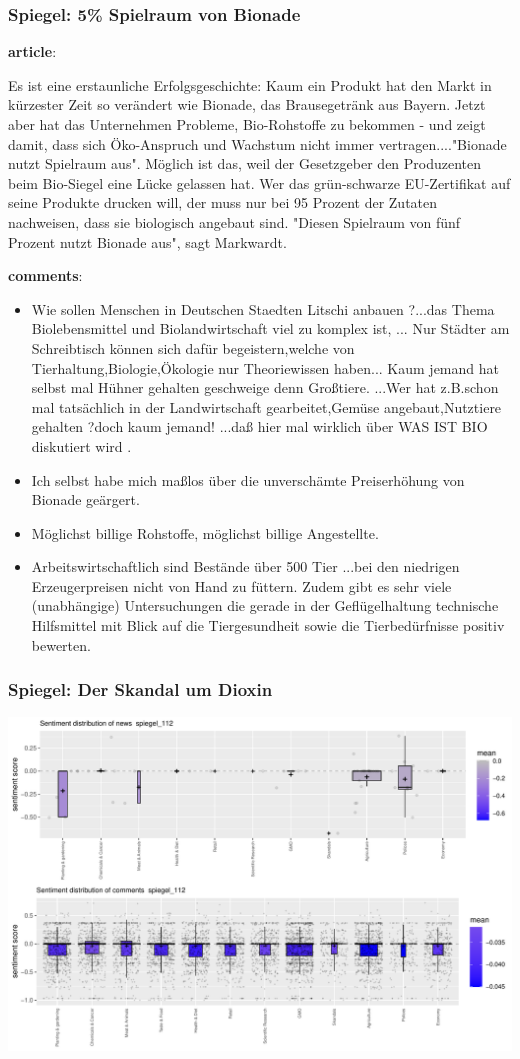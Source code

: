 \documentclass{tum-presentation}
\begin{document}
\begin{frame}
  \frametitle{ Spiegel: 5\% Spielraum von Bionade }
  \begin{description}
    \item \textbf{article}:
    \item Es ist eine erstaunliche Erfolgsgeschichte: Kaum ein Produkt hat den Markt in kürzester Zeit so verändert wie Bionade, das Brausegetränk aus Bayern. Jetzt aber hat das Unternehmen Probleme, Bio-Rohstoffe zu bekommen - und zeigt damit, dass sich Öko-Anspruch und Wachstum nicht immer vertragen...."Bionade nutzt Spielraum aus". Möglich ist das, weil der Gesetzgeber den Produzenten beim Bio-Siegel eine Lücke gelassen hat. Wer das grün-schwarze EU-Zertifikat auf seine Produkte drucken will, der muss nur bei 95 Prozent der Zutaten nachweisen, dass sie biologisch angebaut sind. "Diesen Spielraum von fünf Prozent nutzt Bionade aus", sagt Markwardt.
    \item \textbf{comments}:
    \item  \begin{itemize}
    \item  Wie sollen Menschen in Deutschen Staedten Litschi anbauen ?...das Thema Biolebensmittel und Biolandwirtschaft viel zu komplex ist, ... Nur Städter am Schreibtisch können sich dafür begeistern,welche von Tierhaltung,Biologie,Ökologie nur Theoriewissen haben... Kaum jemand hat selbst mal Hühner gehalten geschweige denn Großtiere. ...Wer hat z.B.schon mal tatsächlich in der Landwirtschaft gearbeitet,Gemüse angebaut,Nutztiere gehalten ?doch kaum jemand! ...daß hier mal wirklich über WAS IST BIO diskutiert wird .
    \item Ich selbst habe mich maßlos über die unverschämte Preiserhöhung von Bionade geärgert.
    \item Möglichst billige Rohstoffe, möglichst billige Angestellte.
    \item Arbeitswirtschaftlich sind Bestände über 500 Tier ...bei den niedrigen Erzeugerpreisen nicht von Hand zu füttern. Zudem gibt es sehr viele (unabhängige) Untersuchungen die gerade in der Geflügelhaltung technische Hilfsmittel mit Blick auf die Tiergesundheit sowie die Tierbedürfnisse positiv bewerten.
    
  \end{itemize}
   \end{description}
\end{frame}
\begin{frame}
  \frametitle{Spiegel: Der Skandal um Dioxin }
  \includegraphics[width =0.65 \textwidth]{figures/boxplot_spiegel_112.pdf}
  
\end{frame}
\end{document}
